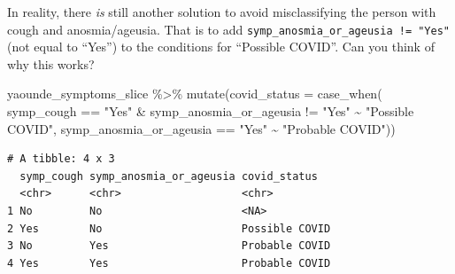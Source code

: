 \documentclass[
  letterpaper,
  DIV=11,
  numbers=noendperiod]{scrreprt}
\newenvironment{Shaded}{\begin{snugshade}}{\end{snugshade}}
\newcommand{\AttributeTok}[1]{\textcolor[rgb]{0.40,0.45,0.13}{#1}}
\newcommand{\FunctionTok}[1]{\textcolor[rgb]{0.28,0.35,0.67}{#1}}
\newcommand{\NormalTok}[1]{\textcolor[rgb]{0.00,0.23,0.31}{#1}}
\newcommand{\SpecialCharTok}[1]{\textcolor[rgb]{0.37,0.37,0.37}{#1}}
\newcommand{\StringTok}[1]{\textcolor[rgb]{0.13,0.47,0.30}{#1}}
\begin{document}
\begin{tcolorbox}[enhanced jigsaw, colframe=quarto-callout-note-color-frame, rightrule=.15mm, opacityback=0, breakable, coltitle=black, colbacktitle=quarto-callout-note-color!10!white, bottomrule=.15mm, leftrule=.75mm, toprule=.15mm, arc=.35mm, bottomtitle=1mm, colback=white, left=2mm, opacitybacktitle=0.6, titlerule=0mm, title=\textcolor{quarto-callout-note-color}{\faInfo}\hspace{0.5em}{Challenge}, toptitle=1mm]

In reality, there \emph{is} still another solution to avoid
misclassifying the person with cough and anosmia/ageusia. That is to add
\texttt{symp\_anosmia\_or\_ageusia\ !=\ "Yes"} (not equal to ``Yes'') to
the conditions for ``Possible COVID''. Can you think of why this works?

\begin{Shaded}
\begin{Highlighting}[]
\NormalTok{yaounde\_symptoms\_slice }\SpecialCharTok{\%\textgreater{}\%} 
  \FunctionTok{mutate}\NormalTok{(}\AttributeTok{covid\_status =} \FunctionTok{case\_when}\NormalTok{(}
\NormalTok{    symp\_cough }\SpecialCharTok{==} \StringTok{"Yes"} \SpecialCharTok{\&}\NormalTok{ symp\_anosmia\_or\_ageusia }\SpecialCharTok{!=} \StringTok{"Yes"} \SpecialCharTok{\textasciitilde{}} \StringTok{"Possible COVID"}\NormalTok{,}
\NormalTok{    symp\_anosmia\_or\_ageusia }\SpecialCharTok{==} \StringTok{"Yes"} \SpecialCharTok{\textasciitilde{}} \StringTok{"Probable COVID"}\NormalTok{))}
\end{Highlighting}
\end{Shaded}

\begin{verbatim}
# A tibble: 4 x 3
  symp_cough symp_anosmia_or_ageusia covid_status  
  <chr>      <chr>                   <chr>         
1 No         No                      <NA>          
2 Yes        No                      Possible COVID
3 No         Yes                     Probable COVID
4 Yes        Yes                     Probable COVID
\end{verbatim}

\end{tcolorbox}
\end{document}
